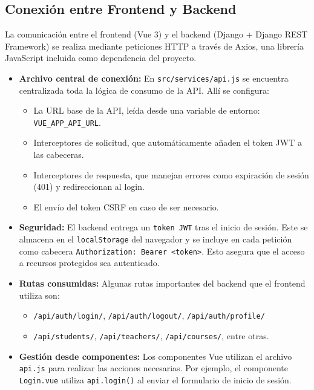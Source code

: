 \documentclass{article}
\begin{document}
    \subsection{Conexión entre Frontend y Backend}

La comunicación entre el frontend (Vue 3) y el backend (Django + Django REST Framework) se realiza mediante peticiones HTTP a través de Axios, una librería JavaScript incluida como dependencia del proyecto.

\begin{itemize}
    \item \textbf{Archivo central de conexión:} En \texttt{src/services/api.js} se encuentra centralizada toda la lógica de consumo de la API. Allí se configura:
    \begin{itemize}
        \item La URL base de la API, leída desde una variable de entorno: \texttt{VUE\_APP\_API\_URL}.
        \item Interceptores de solicitud, que automáticamente añaden el token JWT a las cabeceras.
        \item Interceptores de respuesta, que manejan errores como expiración de sesión (401) y redireccionan al login.
        \item El envío del token CSRF en caso de ser necesario.
    \end{itemize}

    \item \textbf{Seguridad:} El backend entrega un \texttt{token JWT} tras el inicio de sesión. Este se almacena en el \texttt{localStorage} del navegador y se incluye en cada petición como cabecera \texttt{Authorization: Bearer <token>}. Esto asegura que el acceso a recursos protegidos sea autenticado.

    \item \textbf{Rutas consumidas:} Algunas rutas importantes del backend que el frontend utiliza son:
    \begin{itemize}
        \item \texttt{/api/auth/login/}, \texttt{/api/auth/logout/}, \texttt{/api/auth/profile/}
        \item \texttt{/api/students/}, \texttt{/api/teachers/}, \texttt{/api/courses/}, entre otras.
    \end{itemize}

    \item \textbf{Gestión desde componentes:} Los componentes Vue utilizan el archivo \texttt{api.js} para realizar las acciones necesarias. Por ejemplo, el componente \texttt{Login.vue} utiliza \texttt{api.login()} al enviar el formulario de inicio de sesión.


\end{itemize}
\end{document}

